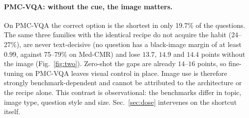 \paragraph{PMC-VQA: without the cue, the image matters.}
On PMC-VQA the correct option is the shortest in only 19.7\% of the questions.
The same three families with the identical recipe do not acquire the habit (24--27\%), are never text-decisive (no question has a black-image margin of at least $0.99$, against 75--79\% on Med-CMR) and lose $13.7$, $14.9$ and $14.4$ points without the image (Fig.~\ref{fig:two}).
Zero-shot the gaps are already $14$--$16$ points, so fine-tuning on PMC-VQA leaves visual control in place.
Image use is therefore strongly benchmark-dependent and cannot be attributed to the architecture or the recipe alone.
This contrast is observational: the benchmarks differ in topic, image type, question style and size.
Sec.~\ref{sec:dose} intervenes on the shortcut itself.

